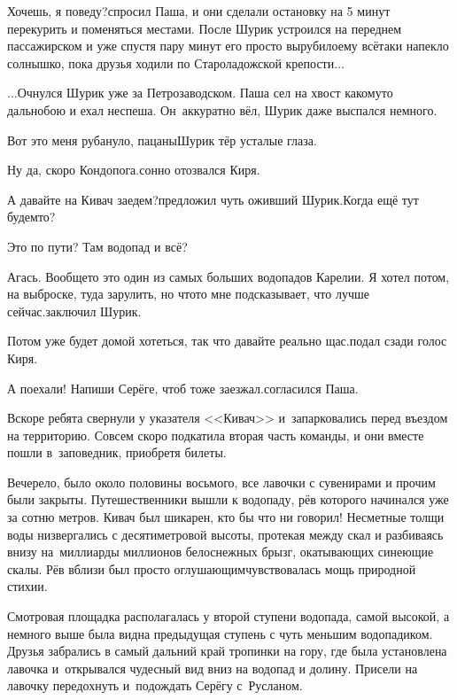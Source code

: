 \diagdash Хочешь, я поведу?\mdash спросил Паша, и они сделали остановку на 5 минут перекурить и поменяться местами. После Шурик устроился на переднем пассажирском и уже спустя пару минут его просто вырубило\mdash ему всё\sdash таки напекло солнышко, пока друзья ходили по Староладожской крепости$\ldots$


$\ldots$Очнулся Шурик уже за Петрозаводском. Паша сел на хвост какому\sdash то дальнобою и ехал неспеша. Он~аккуратно вёл, Шурик даже выспался немного.

\diagdash Вот это меня рубануло, пацаны\mdash Шурик тёр усталые глаза.

\diagdash Ну да, скоро Кондопога.\mdash сонно отозвался Киря.

\diagdash А давайте на Кивач заедем?\mdash предложил чуть оживший Шурик.\mdash Когда ещё тут будем\sdash то?

\diagdash Это по пути? Там водопад и всё?

\diagdash Агась. Вообще\sdash то это один из самых больших водопадов Карелии. Я хотел потом, на выброске, туда зарулить, но что\sdash то мне подсказывает, что лучше сейчас.\mdash заключил Шурик.

\diagdash Потом уже будет домой хотеться, так что давайте реально щас.\mdash подал сзади голос Киря.

\diagdash А поехали! Напиши Серёге, чтоб тоже заезжал.\mdash согласился Паша.

Вскоре ребята свернули у указателя <<Кивач>> и~запарковались перед въездом на территорию. Совсем скоро подкатила вторая часть команды, и они вместе пошли в~заповедник, приобретя билеты.

Вечерело, было около половины восьмого, все лавочки с сувенирами и прочим были закрыты. Путешественники вышли к водопаду, рёв которого начинался уже за сотню метров. Кивач был шикарен, кто бы что ни говорил! Несметные толщи воды низвергались с десятиметровой высоты, протекая между скал и разбиваясь внизу на~миллиарды миллионов белоснежных брызг, окатывающих синеющие скалы. Рёв вблизи был просто оглушающим\mdash чувствовалась мощь природной стихии. 

Смотровая площадка располагалась у второй ступени водопада, самой высокой, а немного выше была видна предыдущая ступень с чуть меньшим водопадиком. Друзья забрались в самый дальний край тропинки на гору, где была установлена лавочка и~открывался чудесный вид вниз на водопад и долину. Присели на лавочку передохнуть и~подождать Серёгу с~Русланом. 

